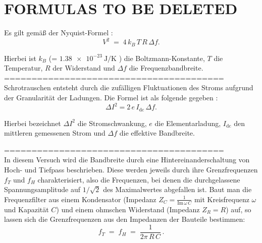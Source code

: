 \chapter{FORMULAS TO BE DELETED}
Es gilt gemäß der Nyquist-Formel \cite{artofelectronics}:
\begin{equation}
  V^2 \;=\; 4\,k_B\,T\,R\,\Delta f. 
\end{equation}

Hierbei ist $k_B$ (= $\SI{1.38e-23}{\joule\per\kelvin}$ \cite{codata}) die Boltzmann-Konstante, $T$ die Temperatur, $R$ der Widerstand und $\Delta f$ die Frequenzbandbreite. 
========================================\\
Schrotrauschen entsteht durch die zufälligen Fluktuationen des Stroms aufgrund der Granularität der Ladungen. 
Die Formel ist als folgende gegeben \cite{artofelectronics}:
\begin{equation}
  \Delta I^2 = 2\,e\,I_{\mathrm{dc}}\,\Delta f.
\end{equation}

Hierbei bezeichnet $\Delta I^2$ die Stromschwankung, $e$ die Elementarladung, $I_{\mathrm{dc}}$ den mittleren gemessenen Strom und $\Delta f$ die effektive Bandbreite.


========================================\\
In diesem Versuch wird die Bandbreite durch eine Hintereinanderschaltung von Hoch- und Tiefpass beschrieben. Diese werden jeweils durch ihre Grenzfrequenzen $f_T$ und $f_H$ charakterisiert, also die Frequenzen, bei denen die durchgelassene Spannungsamplitude auf $1/\sqrt{2}$ des Maximalwertes abgefallen ist. Baut man die Frequenzfilter aus einem Kondensator (Impedanz $Z_C = \tfrac{1}{\mathrm{Im}\,\omega\,C}$ mit Kreisfrequenz $\omega$ und Kapazität $C$) und einem ohmschen Widerstand (Impedanz $Z_R = R$) auf, so lassen sich die Grenzfrequenzen aus den Impedanzen der Bauteile bestimmen:
\begin{equation}
  f_T \;=\; f_H \;=\; \frac{1}{2\pi\,R\,C}\,.
\end{equation}

